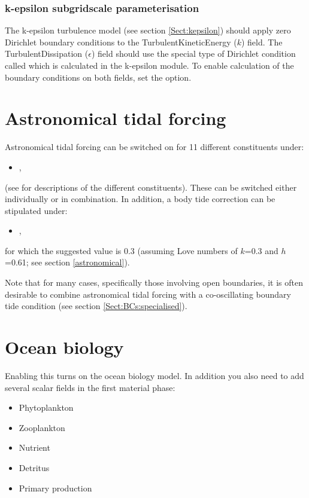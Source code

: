 \subsubsection{k-epsilon subgridscale parameterisation}\label{Sect:BCs:special:kepsilon}

The k-epsilon turbulence model (see section \ref{Sect:kepsilon}) should apply zero Dirichlet boundary
conditions to the TurbulentKineticEnergy ($k$) field. The TurbulentDissipation ($\epsilon$) field
should use the special type of Dirichlet condition called  which is calculated in the
k-epsilon module. To enable calculation of the boundary conditions on both fields, set the \linebreak
{}
option.

\section{Astronomical tidal forcing}
\label{config:tides}

Astronomical tidal forcing can be switched on for 11 different constituents
under:
\begin{itemize}
\item {}, 
\end{itemize}
(see \citealp{Wells2008} for descriptions of
the different constituents). These can be switched either
individually or in combination. In addition, a body tide correction can be stipulated
under:
\begin{itemize}
\item {},
\end{itemize}
for which the suggested value is 0.3 (assuming 
Love numbers of $k$=0.3 and $h$=0.61; see section \ref{astronomical}).   

Note that for many cases, specifically those involving open boundaries, it is often
desirable to combine astronomical tidal forcing with a co-oscillating boundary tide condition
(see section \ref{Sect:BCs:specialised}).

\section{Ocean biology}

Enabling this turns on the ocean biology model. In addition you also need to add several scalar fields in the first material phase:
\begin{itemize}
\item Phytoplankton
\item Zooplankton
\item Nutrient
\item Detritus
\item Primary production
\end{itemize}

